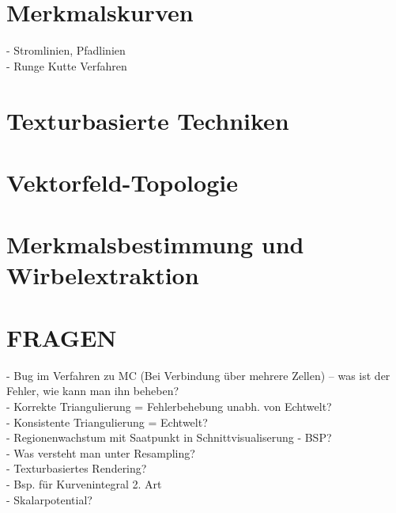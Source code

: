 \documentclass{article}
\begin{document}
\section{Merkmalskurven}
- Stromlinien, Pfadlinien\\
- Runge Kutte Verfahren

\pagebreak
\section{Texturbasierte Techniken}

\pagebreak
\section{Vektorfeld-Topologie}

\pagebreak
\section{Merkmalsbestimmung und Wirbelextraktion}


\pagebreak
\section{FRAGEN}
- Bug im Verfahren zu MC (Bei Verbindung über mehrere Zellen) -- was ist der Fehler, wie kann man ihn beheben?\\
- Korrekte Triangulierung = Fehlerbehebung unabh. von Echtwelt?\\ 
- Konsistente Triangulierung = Echtwelt?\\
- Regionenwachstum mit Saatpunkt in Schnittvisualiserung - BSP?\\
- Was versteht man unter Resampling?\\
- Texturbasiertes Rendering?\\
- Bsp. für Kurvenintegral 2. Art\\
- Skalarpotential?
\end{document}
